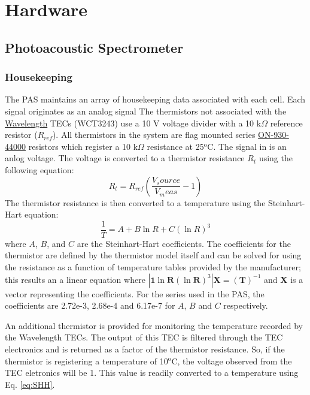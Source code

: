 \documentclass[10pt,twocolumn, twoside, openright]{article}
\newcommand{\dg}{$\mathrm{^o}$}
\begin{document}
%
\section{Hardware}
\subsection{Photoacoustic Spectrometer}
%
\subsubsection{Housekeeping}
%
The PAS maintains an array of housekeeping data associated with each cell.  Each signal originates as an analog signal 
%
The thermistors not associated with the \href{http://www.teamwavelength.com/}{Wavelength} TECs (WCT3243) use a 10 V voltage divider with a 10 k$\Omega$ reference resistor ($R_{ref}$).  All thermistors in the system are flag mounted series \href{http://www.omega.com/toc_asp/frameset.html?book=Temperature&file=ON-930-44000&flag=1}{ON-930-44000} resistors which register a 10 k$\Omega$ resistance at 25\dg{C}.  The signal in is an anlog voltage.  The voltage is converted to a thermistor resistance $R_t$ using the following equation:
%
\begin{equation}\label{eq:Vdiv}
R_t = R_{ref}(\frac{V_source}{V_meas}-1)
\end{equation}
%
The thermistor resistance is then converted to a temperature using the Steinhart-Hart equation:
%
\begin{equation}\label{eq:SHH}
\frac{1}{T} = A+B\ln{R} + C(\ln{R})^3
\end{equation}
%
where $A$, $B$, and $C$ are the Steinhart-Hart coefficients.  The coefficients for the thermistor are defined by the thermistor model itself and can be solved for using the resistance as a function of temperature tables provided by the manufacturer; this results an a linear equation where $|\mathbf{1} \ln{\mathbf{R}} (\ln{\mathbf{R}})^3|\mathbf{X} = (\mathbf{T})^{-1}$ and $\mathbf{X}$ is a vector representing the coefficients.  For the series used in the PAS, the coefficients are 2.72e-3, 2.68e-4 and 6.17e-7 for $A$, $B$ and $C$ respectively. \par
%
An additional thermistor is provided for monitoring the temperature recorded by the Wavelength TECs.  The output of this TEC is filtered through the TEC electronics and is returned as a factor of the thermistor resistance.  So, if the thermistor is registering a temperature of 10\dg{C}, the voltage observed from the TEC eletronics will be 1.  This value is readily converted to a temperature using Eq. \ref{eq:SHH}.\par
\end{document}
